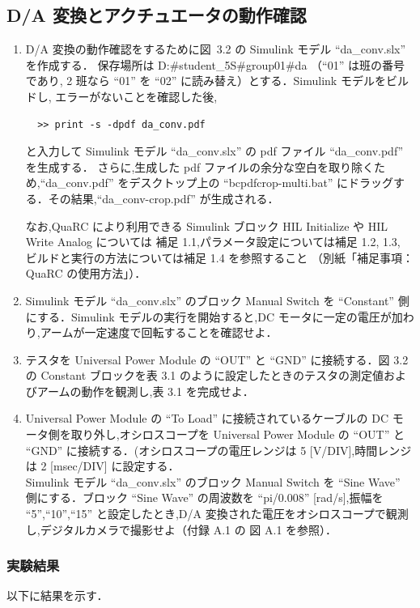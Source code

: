 \subsection{D/A 変換とアクチュエータの動作確認}
\begin{enumerate}
  \item D/A 変換の動作確認をするために図~3.2 の Simulink モデル ``da\_conv.slx'' を作成する．
        保存場所は D:\#student\_5S\#group01\#da （``01'' は班の番号であり,
        2 班なら ``01'' を ``02'' に読み替え）とする．Simulink モデルをビルドし,
        エラーがないことを確認した後,
        \begin{lstlisting}
  >> print -s -dpdf da_conv.pdf    
  \end{lstlisting}
        と入力して Simulink モデル ``da\_conv.slx'' の pdf ファイル ``da\_conv.pdf'' を生成する．
        さらに,生成した pdf ファイルの余分な空白を取り除くため,``da\_conv.pdf'' をデスクトップ上の
        ``bcpdfcrop-multi.bat'' にドラッグする．その結果,``da\_conv-crop.pdf'' が生成される．
        
        なお,QuaRC により利用できる Simulink ブロック HIL Initialize や HIL Write Analog については
        補足 1.1,パラメータ設定については補足 1.2, 1.3, ビルドと実行の方法については補足 1.4 を参照すること
        （別紙「補足事項：QuaRC の使用方法」）．
  \item Simulink モデル “da\_conv.slx” のブロック Manual Switch を “Constant” 側にする．Simulink モデルの実行を開始すると,DC モータに一定の電圧が加わり,アームが一定速度で回転することを確認せよ．
  \item テスタを Universal Power Module の “OUT” と “GND” に接続する．図 3.2 の Constant ブロックを表 3.1 のように設定したときのテスタの測定値およびアームの動作を観測し,表 3.1 を完成せよ．
  \item Universal Power Module の “To Load” に接続されているケーブルの DC モータ側を取り外し,オシロスコープを Universal Power Module の “OUT” と “GND” に接続する．(オシロスコープの電圧レンジは 5 [V/DIV],時間レンジは 2 [msec/DIV] に設定する．\\
        \quad Simulink モデル “da\_conv.slx” のブロック Manual Switch を “Sine Wave” 側にする．ブロック “Sine Wave” の周波数を “pi/0.008” [rad/s],振幅を “5”,“10”,“15” と設定したとき,D/A 変換された電圧をオシロスコープで観測し,デジタルカメラで撮影せよ（付録 A.1 の 図 A.1 を参照）．
\end{enumerate}

\subsubsection{実験結果}
以下に結果を示す．

